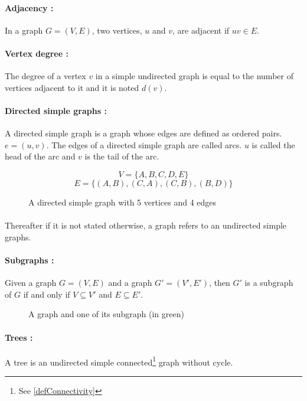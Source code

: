 \paragraph{Adjacency :}
In a graph $G=(V,E)$, two vertices, $u$ and $v$, are adjacent if $uv \in E$.

\paragraph{Vertex degree :}
The degree of a vertex $v$ in a simple undirected graph is equal to the number of
vertices adjacent to it and it is noted $d(v)$.

\paragraph{Directed simple graphs :} 
A directed simple graph is a graph whose edges are defined as ordered pairs.
$e=(u,v)$. The edges of a directed simple graph are called arcs. 
$u$ is called the head of the arc and $v$ is the tail of the arc.
\begin{figure}[!h]
  \begin{center}
    
  \end{center}
  $$V = \{A,B,C,D,E\}$$
  $$E = \Big\{(A,B),(C,A),(C,B),(B,D)\Big\}$$
  \caption{A directed simple graph with 5 vertices and 4 edges}
\end{figure}

\paragraph{}
Thereafter if it is not stated otherwise, a graph refers to an undirected 
simple graphs.

\paragraph{Subgraphs :}
Given a graph $G = (V,E)$ and a graph $G' = (V',E')$, then $G'$ is a subgraph of $G$ 
if and only if $V \subseteq V'$ and $E \subseteq E'$.

\begin{figure}[!h]
  \begin{center}
    
  \end{center}
  \caption{A graph and one of its subgraph (in green)}
\end{figure}

\paragraph{Trees :}
A tree is an undirected simple connected\footnote{See \ref{defConnectivity}}
graph without cycle.

